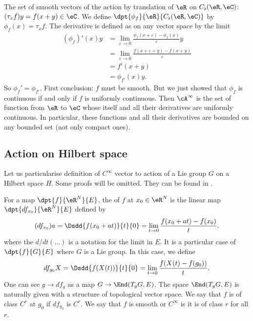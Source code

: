 \begin{example}
 The set of smooth vectors of the action by translation of $\eR$ on $ C_{\flat}(\eR,\eC)$: $(\tau_xf)y=f(x+y)\in\eC$. We define $\dpt{\phi_f}{\eR}{C_{\flat}(\eR,\eC)}$ by $\phi_f(x)=\tau_xf$. The derivative is defined as on any vector space by the limit
\begin{equation}
\begin{split}
   (\phi_f)'(x)y&=\lim_{\varepsilon\to 0}\frac{\phi_f(x+\varepsilon)-\phi_f(x)}{\varepsilon}y\\
                &=\lim_{\varepsilon\to 0}\frac{f(x+\varepsilon+y)-f(x+y)}{\varepsilon}\\
                &=f'(x+y)\\
                &=\phi_{f'}(x)y.
\end{split}
\end{equation}
So $\phi_f'=\phi_{f'}$. First conclusion: $f$ must be smooth. But we just showed that $\phi_f$ is continuous if and only if $f$ is uniformly continuous. Then $\cA^{\infty}$ is the set of function from $\eR$ to $\eC$ whose itself and all their derivatives are uniformly continuous. In particular, these functions and all their derivatives are bounded on any bounded set (not only compact ones).

\end{example}

\subsection{Action on Hilbert space}

Let us particularise definition of $ C^{\infty}$ vector to action of a Lie group $G$ on a Hilbert space $H$. Some proofs will be omitted. They can be found in \cite{Knapp_reprez}.

For a map $\dpt{f}{\eR^N}{E}$, the  of $f$ at $x_0\in\eR^N$ is the linear map $\dpt{df_{x_0}}{\eR^N}{E}$ defined by
\begin{equation}
(df_{x_0})a=\Dsdd{ f(x_0+at) }{t}{0}=\lim_{t\to 0}\frac{f(x_0+at)-f(x_0)}{t}.
\end{equation}
where the $d/dt(\ldots)$ is a notation for the limit in $E$. It is a particular case of $\dpt{f}{G}{E}$ where $G$ is a Lie group. In this case, we define
\begin{equation}
  df_{g_0}X=\Dsdd{ f(X(t)) }{t}{0}=\lim_{t\to 0}\frac{f(X(t)-f(g_0))}{t}.
\end{equation}
One can see $g\to df_g$ as a map $G\to \End(T_gG,E)$. The space $\End(T_gG,E)$ is naturally given with a structure of topological vector space. We say that $f$ is of class $C^r$ at $g_0$ if $df_{g_0}$ is $C^r$. We say that $f$ is smooth or $ C^{\infty}$ is it is of class $r$ for all $r$.

